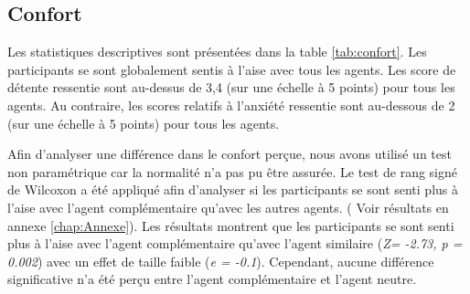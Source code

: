 	\subsection{Confort}
		
		Les statistiques descriptives sont présentées dans la table \ref{tab:confort}. Les participants se sont globalement sentis à l'aise avec tous les agents.
		Les score de détente ressentie sont au-dessus de 3,4 (sur une échelle à 5 points) pour tous les agents. Au contraire, les scores relatifs à l'anxiété  ressentie sont au-dessous de 2 (sur une échelle à 5 points) pour tous les agents. 
		
		Afin d'analyser une différence dans le confort perçue, nous avons utilisé un test non paramétrique car la normalité n'a pas pu être assurée. Le test de rang signé de Wilcoxon a été appliqué afin d'analyser si les participants se sont senti plus à l'aise avec l'agent complémentaire qu'avec les autres agents. ( Voir résultats en annexe \ref{chap:Annexe}). 
		Les résultats montrent que les participants se sont senti plus à l'aise avec l'agent complémentaire qu'avec l'agent similaire (\emph{Z= -2.73, p = 0.002})
		avec un effet de taille faible (\emph{e = -0.1}). Cependant, aucune différence significative n'a été perçu entre l'agent complémentaire et l'agent neutre. 
	
